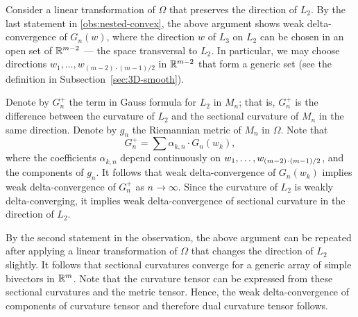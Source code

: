 Consider a linear transformation of $\Omega$ that preserves the direction of $L_2$.
By the last statement in \ref{obs:nested-convex},
the above argument shows weak delta-convergence of $G_n(w)$, where the direction $w$ of $L_3$ on $L_2$ can be chosen in an open set of $\mathbb{R}^{m-2}$ --- the space transversal to $L_2$.
In particular, we may choose directions $w_1,\dots, w_{(m-2)\cdot(m-1)/2}$ in $\mathbb{R}^{m-2}$ that form a generic set (see the  definition in Subsection~\ref{sec:3D-smooth}).

Denote by $G_n^+$ the term in Gauss formula for $L_2$ in $M_n$;
that is, $G_n^+$ is the difference between the curvature of $L_2$ and the sectional curvature of $M_n$ in the same direction.
Denote by $g_n$ the Riemannian metric of $M_n$ in $\Omega$.
Note that 
\[G_n^+=\sum\alpha_{k,n}\cdot G_n(w_k),\]
where the coefficients $\alpha_{k,n}$ depend continuously on $w_1,\zz\dots, w_{(m-2)\cdot(m-1)/2}$, and the components of $g_n$. 
It follows that weak delta-convergence of $G_n(w_k)$ implies weak delta-convergence of $G_n^+$ as $n\to\infty$.
Since the curvature of $L_2$ is weakly delta-converging, it implies weak delta-convergence of sectional curvature in the direction of $L_2$.

By the second statement in the observation,
the above argument can be repeated after applying a linear transformation of $\Omega$ that changes the direction of $L_2$ slightly.
It follows that sectional curvatures converge for a generic array of simple bivectors in $\mathbb{R}^m$.
Note that the curvature tensor can be expressed from these sectional curvatures and the metric tensor.
Hence, the weak delta-convergence of components of curvature tensor and therefore dual curvature tensor follows.
\qeds

